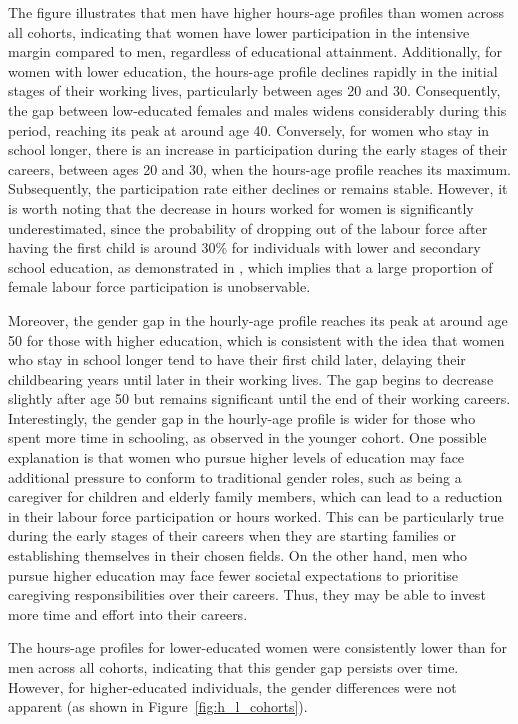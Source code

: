 \documentclass[12pt]{article}
\begin{document}
\par
The figure illustrates that men have higher hours-age profiles than women across all cohorts, indicating that women have
lower participation in the intensive margin compared to men, regardless of educational attainment. Additionally, for
women with lower education, the hours-age profile declines rapidly in the initial stages of their working lives,
particularly between ages 20 and 30. Consequently, the gap between low-educated females and males widens considerably
during this period, reaching its peak at around age 40. Conversely, for women who stay in school longer, there is an
increase in participation during the early stages of their careers, between ages 20 and 30, when the hours-age profile
reaches its maximum. Subsequently, the participation rate either declines or remains stable. However, it is worth noting
that the decrease in hours worked for women is significantly underestimated, since the probability of dropping out of
the labour force after having the first child is around 30\% for individuals with lower and secondary school education, as
demonstrated in \citet{Bratti2005}, which implies that a large proportion of female labour force participation is
unobservable.

\par
Moreover, the gender gap in the hourly-age profile reaches its peak at around age 50 for those with higher education,
which is consistent with the idea that women who stay in school longer tend to have their first child later, delaying
their childbearing years until later in their working lives. The gap begins to decrease slightly after age 50 but
remains significant until the end of their working careers. Interestingly, the gender gap in the hourly-age profile is
wider for those who spent more time in schooling, as observed in the younger cohort. One possible explanation is that
women who pursue higher levels of education may face additional pressure to conform to traditional gender roles, such as
being a caregiver for children and elderly family members, which can lead to a reduction in their labour force
participation or hours worked. This can be particularly true during the early stages of their careers when they are
starting families or establishing themselves in their chosen fields. On the other hand, men who pursue higher education
may face fewer societal expectations to prioritise caregiving responsibilities over their careers. Thus, they may be
able to invest more time and effort into their careers.


The hours-age profiles for lower-educated women were consistently lower than for men across all cohorts, indicating that
this gender gap persists over time. However, for higher-educated individuals, the gender differences were not apparent
(as shown in Figure~\ref{fig:h_l_cohorts}).
\end{document}
